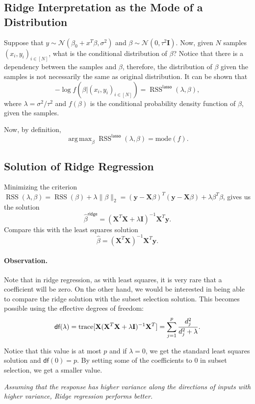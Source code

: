 \documentclass[11pt]{article}
\theoremstyle{definition}
\newcommand{\XX}{\mathbf{X}}
\newcommand{\yy}{\mathbf{y}}
\newcommand{\II}{\mathbf{I}}
\newcommand{\ridge}{\textsf{ridge}}
\newcommand{\lasso}{\textsf{lasso}}
\newcommand{\df}{\textsf{df}}
\newcommand{\Normal}[2]{\ensuremath{\mathcal N (#1, #2)}}
\DeclareMathOperator*{\argmax}{arg\,max}
\DeclareMathOperator*{\RSS}{RSS} \DeclareMathOperator*{\WRSS}{WRSS}
\begin{document}
\subsection{Ridge Interpretation as the Mode of a Distribution}
Suppose that $y\sim \Normal{\beta_0+x^T\beta}{\sigma^2}$ and
$\beta\sim\Normal{0}{\tau^2 \II}$. Now, given $N$ samples $(x_i,y_i)_{i\in[N]}$,
what is the conditional distribution of $\beta$? Notice that there is a
dependency between the samples and $\beta$, therefore, the distribution of
$\beta$ given the samples is not necessarily the same as original distribution.
It can be shown that
\[-\log f(\beta|(x_i,y_i)_{i\in[N]})=\RSS^\lasso(\lambda,\beta),\] where
$\lambda=\sigma^2/\tau^2$ and $f(\beta)$ is the conditional probability density
function of $\beta$, given the samples.

Now, by definition,
\[\argmax_\beta\RSS^\lasso(\lambda,\beta) = \text{mode}(f).\]

\subsection{Solution of Ridge Regression}
Minimizing the criterion $\RSS(\lambda,\beta) = \RSS(\beta) + \lambda\|\beta\|_2
= (\yy-\XX\beta)^T(\yy-\XX\beta)+\lambda\beta^T\beta$, gives us the solution
\[
	\hat\beta^\ridge = (\XX^T\XX+\lambda \II)^{-1}\XX^T\yy.\]
Compare this with the least squares solution 
\[\hat\beta = (\XX^T\XX)^{-1}\XX^T\yy.\]

\paragraph{Observation.} Note that in ridge regression, as with least squares,
it is very rare that a coefficient will be zero. On the other hand, we would be
interested in being able to compare the ridge solution with the subset selection
solution. This becomes possible using the effective degrees of freedom:
\[\df(\lambda)=\tr[\XX(\XX^T\XX+\lambda\II)^{-1}\XX^T]=\sum_{j=1}^p\frac{d_j^2}{d_j^2+\lambda}.\]

Notice that this value is at most $p$ and if $\lambda=0$, we get the standard
least squares solution and $\df(0)=p$. By setting some of the coefficients to 0
in subset selection, we get a smaller value.

\begin{center}
	\emph{Assuming that the response has higher variance along the directions of
	inputs with higher variance, Ridge regression performs better.}
\end{center}
\end{document}
